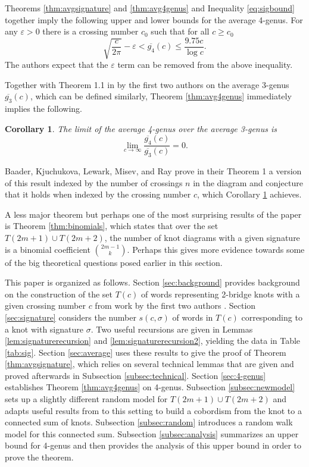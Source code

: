 \documentclass[12pt]{amsart}
\newtheorem{corollary}[theorem]{Corollary}
\theoremstyle{definition}
\theoremstyle{remark}
\numberwithin{equation}{section}
\begin{document}
 Theorems \ref{thm:avgsignature} and \ref{thm:avg4genus} and Inequality \eqref{eq:sigbound} together imply the following upper and lower bounds for the average 4-genus. For any $\varepsilon>0$ there is a crossing number $c_0$ such that for all $c\geq c_0$
\[ \sqrt{\frac{c}{2\pi}}-\varepsilon < \overline{g_4}(c)\leq \frac{9.75c}{\log c}.
\]
The authors expect that the $\varepsilon$ term can be removed from the above inequality.


Together with Theorem 1.1 in \cite{CohLow} by the first two authors on the average 3-genus $\overline{g_3}(c)$, which can be defined similarly, Theorem \ref{thm:avg4genus} immediately implies the following.

\begin{corollary}
\label{cor:limit}
The limit of the average 4-genus over the average 3-genus is
$$\lim_{{c\to\infty}} \frac{\overline{g_4}(c)}{\overline{g_3}(c)}=0.$$
\end{corollary}

Baader, Kjuchukova, Lewark, Misev, and Ray \cite{BKLMR} prove in their Theorem 1 a version of this result indexed by the number of crossings $n$ in the diagram and conjecture that it holds when indexed by the crossing number $c$, which Corollary \ref{cor:limit} achieves.

A less major theorem but perhaps one of the most surprising results of the paper is Theorem \ref{thm:binomials}, which states that over the set $T(2m+1)\cup T(2m+2)$, the number of knot diagrams with a given signature is a binomial coefficient $\displaystyle\binom{2m-1}{k}$.  Perhaps this gives more evidence towards some of the big theoretical questions posed earlier in this section.





This paper is organized as follows. Section \ref{sec:background} provides background on the construction of the set $T(c)$ of words representing 2-bridge knots with a given crossing number $c$ from work by the first two authors \cite{CohLow}. Section \ref{sec:signature} considers the number $s(c,\sigma)$ of words in $T(c)$ corresponding to a knot with signature $\sigma$.  Two useful recursions are given in Lemmas \ref{lem:signaturerecursion} and \ref{lem:signaturerecursion2}, yielding the data in Table \ref{tab:sig}.  Section \ref{sec:average} uses these results to give the proof of Theorem \ref{thm:avgsignature}, which relies on several technical lemmas that are given and proved afterwards in Subsection \ref{subsec:technical}. Section \ref{sec:4-genus} establishes Theorem \ref{thm:avg4genus} on 4-genus. Subsection \ref{subsec:newmodel} sets up a slightly different random model for $T(2m+1)\cup T(2m+2)$ and adapts useful results from \cite{BKLMR} to this setting to build a cobordism from the knot to a connected sum of knots.  Subsection \ref{subsec:random} introduces a random walk model for this connected sum.  Subsection \ref{subsec:analysis} summarizes an upper bound for 4-genus and then provides the analysis of this upper bound in order to prove the theorem.
\end{document}
